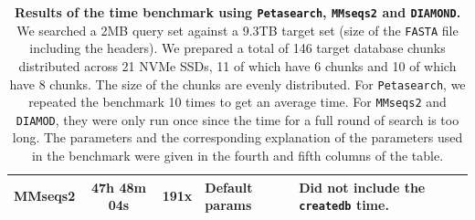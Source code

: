 \begin{figpage}
\begin{table}[]
\begin{tabular}{|c|c|c|l|l|}
      \rowcolor[HTML]{FFFFFF}
      MMseqs2                                                                                & 47h 48m 04s & 191x & Default params                   & Did not include the \texttt{createdb} time. \\ \hline
    \end{tabular}
    \caption{\textbf{Results of the time benchmark using \texttt{Petasearch}, \texttt{MMseqs2} and \texttt{DIAMOND}.}
      We searched a 2MB query set against a 9.3TB target set (size of the \texttt{FASTA} file including the headers). We prepared a total of 146 target database chunks distributed across 21 NVMe SSDs, 11 of which have 6 chunks and 10 of which have 8 chunks.
      The size of the chunks are evenly distributed. For \texttt{Petasearch}, we repeated the benchmark 10 times to get an average time.
      For \texttt{MMseqs2} and \texttt{DIAMOD}, they were only run once since the time for a full round of search is too long. The parameters and the corresponding explanation of the parameters used in the benchmark were given in the fourth and fifth columns of the table.}
    \label{tab:time_benchmark}
  \end{table}
  \restoregeometry
\end{figpage}
\pagebreak

